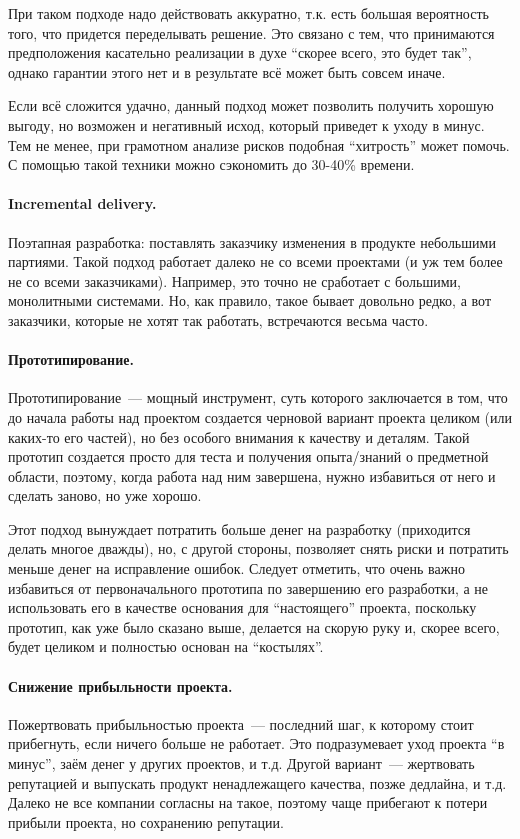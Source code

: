 \documentclass{../../text-style}
\begin{document}
При таком подходе надо действовать аккуратно, т.к. есть большая вероятность того, что придется переделывать решение. Это связано с тем, что принимаются предположения касательно реализации в духе \enquote{скорее всего, это будет так}, однако гарантии этого нет и в результате всё может быть совсем иначе.

Если всё сложится удачно, данный подход может позволить получить хорошую выгоду, но возможен и негативный исход, который приведет к уходу в минус. Тем не менее, при грамотном анализе рисков подобная \enquote{хитрость} может помочь. С помощью такой техники можно сэкономить до 30-40\% времени.

\paragraph{Incremental delivery.} Поэтапная разработка: поставлять заказчику изменения в продукте небольшими партиями. Такой подход работает далеко не со всеми проектами (и уж тем более не со всеми заказчиками). Например, это точно не сработает с большими, монолитными системами. Но, как правило, такое бывает довольно редко, а вот заказчики, которые не хотят так работать, встречаются весьма часто.

\paragraph{Прототипирование.} Прототипирование~--- мощный инструмент, суть которого заключается в том, что до начала работы над проектом создается черновой вариант проекта целиком (или каких-то его частей), но без особого внимания к качеству и деталям. Такой прототип создается просто для теста и получения опыта/знаний о предметной области, поэтому, когда работа над ним завершена, нужно избавиться от него и сделать заново, но уже хорошо.

Этот подход вынуждает потратить больше денег на разработку (приходится делать многое дважды), но, с другой стороны, позволяет снять риски и потратить меньше денег на исправление ошибок. Следует отметить, что очень важно избавиться от первоначального прототипа по завершению его разработки, а не использовать его в качестве основания для \enquote{настоящего} проекта, поскольку прототип, как уже было сказано выше, делается на скорую руку и, скорее всего, будет целиком и полностью основан на \enquote{костылях}.

\paragraph{Снижение прибыльности проекта.} Пожертвовать прибыльностью проекта~--- последний шаг, к которому стоит прибегнуть, если ничего больше не работает. Это подразумевает уход проекта \enquote{в минус}, заём денег у других проектов, и т.д. Другой вариант~--- жертвовать репутацией и выпускать продукт ненадлежащего качества, позже дедлайна, и т.д. Далеко не все компании согласны на такое, поэтому чаще прибегают к потери прибыли проекта, но сохранению репутации.
\end{document}
